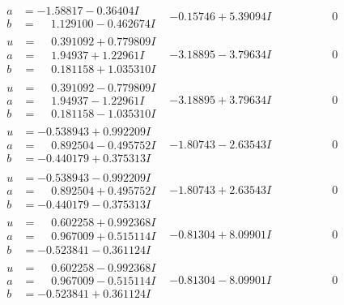 \documentclass[1p]{elsarticle_modified}
\theoremstyle{definition}
\begin{document}
$$\begin{array}{c|c|c}
\begin{aligned}
a &= -1.58817 - 0.36404 I \\
b &= \phantom{-}1.129100 - 0.462674 I\end{aligned}
 & -0.15746 + 5.39094 I & \phantom{-0.000000 } 0 \\ \hline\begin{aligned}
u &= \phantom{-}0.391092 + 0.779809 I \\
a &= \phantom{-}1.94937 + 1.22961 I \\
b &= \phantom{-}0.181158 + 1.035310 I\end{aligned}
 & -3.18895 - 3.79634 I & \phantom{-0.000000 } 0 \\ \hline\begin{aligned}
u &= \phantom{-}0.391092 - 0.779809 I \\
a &= \phantom{-}1.94937 - 1.22961 I \\
b &= \phantom{-}0.181158 - 1.035310 I\end{aligned}
 & -3.18895 + 3.79634 I & \phantom{-0.000000 } 0 \\ \hline\begin{aligned}
u &= -0.538943 + 0.992209 I \\
a &= \phantom{-}0.892504 - 0.495752 I \\
b &= -0.440179 + 0.375313 I\end{aligned}
 & -1.80743 - 2.63543 I & \phantom{-0.000000 } 0 \\ \hline\begin{aligned}
u &= -0.538943 - 0.992209 I \\
a &= \phantom{-}0.892504 + 0.495752 I \\
b &= -0.440179 - 0.375313 I\end{aligned}
 & -1.80743 + 2.63543 I & \phantom{-0.000000 } 0 \\ \hline\begin{aligned}
u &= \phantom{-}0.602258 + 0.992368 I \\
a &= \phantom{-}0.967009 + 0.515114 I \\
b &= -0.523841 - 0.361124 I\end{aligned}
 & -0.81304 + 8.09901 I & \phantom{-0.000000 } 0 \\ \hline\begin{aligned}
u &= \phantom{-}0.602258 - 0.992368 I \\
a &= \phantom{-}0.967009 - 0.515114 I \\
b &= -0.523841 + 0.361124 I\end{aligned}
 & -0.81304 - 8.09901 I & \phantom{-0.000000 } 0\\

\end{array}$$
\end{document}
